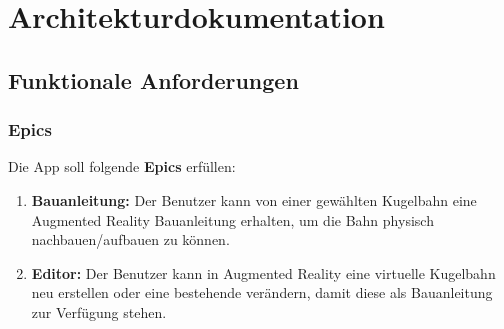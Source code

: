 \section{Architekturdokumentation}
\subsection{Funktionale Anforderungen}
\subsubsection{Epics}
Die App soll folgende \textbf{Epics} erfüllen:
\begin{enumerate}
	\item \textbf{Bauanleitung:} Der Benutzer kann von einer gewählten Kugelbahn eine Augmented Reality Bauanleitung erhalten, um die Bahn physisch nachbauen/aufbauen zu können.
	\item \textbf{Editor:} Der Benutzer kann in Augmented Reality eine virtuelle Kugelbahn neu erstellen oder eine bestehende verändern, damit diese als Bauanleitung zur Verfügung stehen.
\end{enumerate}

